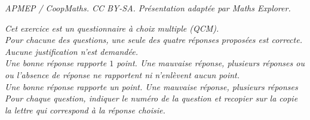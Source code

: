 \documentclass[10pt]{article}
\begin{document}
\noindent\textit{APMEP / CoopMaths. CC BY-SA. Présentation adaptée par Maths Explorer.}\par\medskip
\emph{Cet exercice est un questionnaire à choix multiple (QCM).\\
Pour chacune des questions, une seule des quatre réponses proposées est correcte.\\
Aucune justification n'est demandée.\\
Une bonne  réponse  rapporte $1$ point. Une mauvaise réponse, plusieurs réponses  ou ou l'absence de réponse ne rapportent ni n'enlèvent aucun point.\\
Une bonne réponse rapporte un point. Une mauvaise réponse, plusieurs réponses 
Pour chaque question, indiquer le numéro de la question et recopier sur la copie la lettre qui correspond à la réponse choisie.}


\medskip
\end{document}
